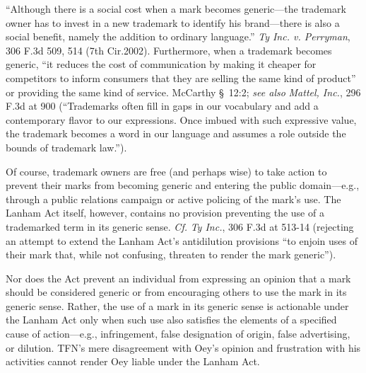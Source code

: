 ``Although there is a social cost when a mark becomes generic---the trademark
owner has to invest in a new trademark to identify his brand---there is also a
social benefit, namely the addition to ordinary language.'' \textit{Ty Inc. v.
Perryman}, 306 F.3d 509, 514 (7th Cir.2002). Furthermore, when a trademark
becomes generic, ``it reduces the cost of communication by making it cheaper for
competitors to inform consumers that they are selling the same kind of product''
or providing the same  kind of service. McCarthy \S~12:2; \textit{see also}
\textit{Mattel, Inc.}, 296 F.3d at 900 (``Trademarks often fill in gaps in our
vocabulary and add a contemporary flavor to our expressions. Once imbued with
such expressive value, the trademark becomes a word in our language and assumes
a role outside the bounds of trademark law.'').

Of course, trademark owners are free (and perhaps wise) to take action to
prevent their marks from becoming generic and entering the public domain---e.g.,
through a public relations campaign or active policing of the mark's use. The
Lanham Act itself, however, contains no provision preventing the use of a
trademarked term in its generic sense. \textit{Cf.} \textit{Ty Inc.}, 306 F.3d
at 513-14 (rejecting
an attempt to extend the Lanham Act's antidilution provisions ``to enjoin uses
of their mark that, while not confusing, threaten to render the mark generic'').

Nor does the Act prevent an individual from expressing an opinion that a mark
should be considered generic or from encouraging others to use the mark in its
generic sense. Rather, the use of a mark in its generic sense is actionable
under the Lanham Act only when such use also satisfies the elements of a
specified cause of action---e.g., infringement, false designation of origin,
false advertising, or dilution. TFN's mere disagreement with Oey's opinion and
frustration with his activities cannot render Oey liable under the Lanham Act.



